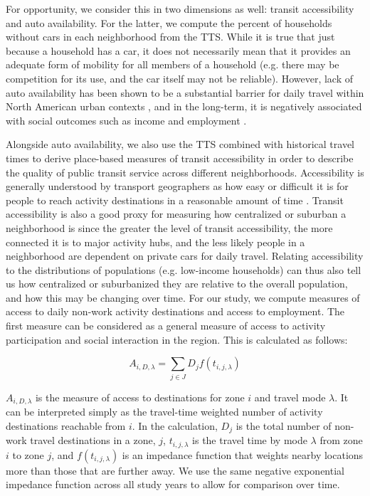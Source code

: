 For opportunity, we consider this in two dimensions as well: transit accessibility and auto availability. For the latter, we compute the percent of households without cars in each neighborhood from the TTS. While it is true that just because a household has a car, it does not necessarily mean that it provides an adequate form of mobility for all members of a household (e.g. there may be competition for its use, and the car itself may not be reliable). However, lack of auto availability has been shown to be a substantial barrier for daily travel within North American urban contexts \cite{blumenberg_car-deficit_2018,allen_planning_2020}, and in the long-term, it is negatively associated with social outcomes such as income and employment \cite{blumenberg_driving_2014,smart_disentangling_2020}. 

Alongside auto availability, we also use the TTS combined with historical travel times to derive place-based measures of transit accessibility in order to describe the quality of public transit service across different neighborhoods. Accessibility is generally understood by transport geographers as how easy or difficult it is for people to reach activity destinations in a reasonable amount of time \cite{hansen_how_1959,geurs_accessibility_2004,el-geneidy_access_2006}. Transit accessibility is also a good proxy for measuring how centralized or suburban a neighborhood is since the greater the level of transit accessibility, the more connected it is to major activity hubs, and the less likely people in a neighborhood are dependent on private cars for daily travel. Relating accessibility to the distributions of populations (e.g. low-income households) can thus also tell us how centralized or suburbanized they are relative to the overall population, and how this may be changing over time. For our study, we compute measures of access to daily non-work activity destinations and access to employment. The first measure can be considered as a general measure of access to activity participation and social interaction in the region. This is calculated as follows:

\begin{equation}
A_{i,D,\lambda} = \sum_{j \in J} D_{j} f(t_{i,j,\lambda})
\end{equation}

$A_{i,D,\lambda}$ is the measure of access to destinations for zone $i$ and travel mode $\lambda$. It can be interpreted simply as the travel-time weighted number of activity destinations reachable from $i$. In the calculation, $D_j$ is the total number of non-work travel destinations in a zone, $j$, $t_{i,j,\lambda}$ is the travel time by mode $\lambda$ from zone $i$ to zone $j$, and $f(t_{i,j,\lambda})$ is an impedance function that weights nearby locations more than those that are further away. We use the same negative exponential impedance function across all study years to allow for comparison over time.

